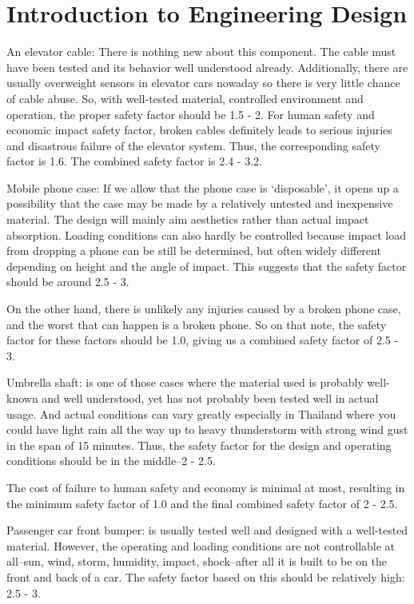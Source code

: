 \documentclass[
10pt,
a4paper,
openany,
svgnames,
]{book}
\begin{document}
\section{Introduction to Engineering Design}

\begin{evensolution}
  
\item An elevator cable: There is nothing new about this component. The cable must have been tested and its behavior well understood already. Additionally, there are usually overweight sensors in elevator cars nowaday so there is very little chance of cable abuse. So, with well-tested material, controlled environment and operation, the proper safety factor should be 1.5 - 2. For human safety and economic impact safety factor, broken cables definitely leads to serious injuries and disastrous failure of the elevator system. Thus, the corresponding safety factor is 1.6. The combined safety factor is 2.4 - 3.2.
\item Mobile phone case: If we allow that the phone case is `disposable', it opens up a possibility that the case may be made by a relatively untested and inexpensive material. The design will mainly aim aesthetics rather than actual impact absorption. Loading conditions can also hardly be controlled because impact load from dropping a phone can be still be determined, but often widely different depending on height and the angle of impact. This suggests that the safety factor should be around 2.5 - 3.

  On the other hand, there is unlikely any injuries caused by a broken phone case, and the worst that can happen is a broken phone. So on that note, the safety factor for these factors should be 1.0, giving us a combined safety factor of 2.5 - 3.
\item Umbrella shaft: is one of those cases where the material used is probably well-known and well understood, yet has not probably been tested well in actual usage. And actual conditions can vary greatly especially in Thailand where you could have light rain all the way up to heavy thunderstorm with strong wind gust in the span of 15 minutes. Thus, the safety factor for the design and operating conditions should be in the middle--2 - 2.5.

  The cost of failure to human safety and economy is minimal at most, resulting in the minimum safety factor of 1.0 and the final combined safety factor of 2 - 2.5.

\item Passenger car front bumper: is usually tested well and designed with a well-tested material. However, the operating and loading conditions are not controllable at all--sun, wind, storm, humidity, impact, shock--after all it is built to be on the front and back of a car. The safety factor based on this should be relatively high: 2.5 - 3.


\end{evensolution}
\end{document}
